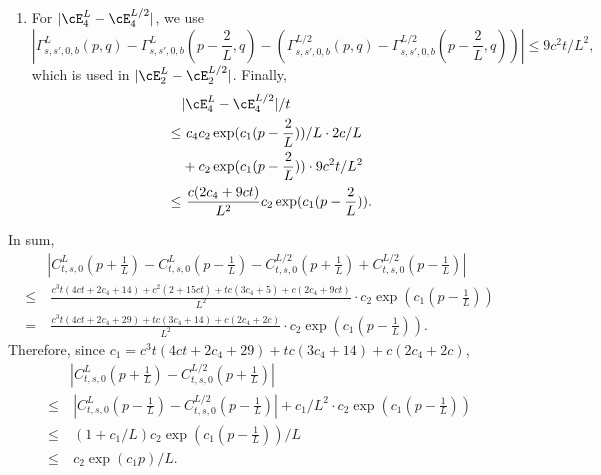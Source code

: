 \begin{enumerate}
    \[\tilde\cE_3^L=\frac2L\sum_{s'=0}^s C_{t,s',0}^{L}(p)\Gamma_{s,s',0,0}^{L}(p,p).\]
    Then we can bound
    \begin{align*}
        & |\cE_3^L-\cE_3^{L/2}|\\
        \leq &~ |\cE_3^L-\tilde\cE_3^{L}|+|\tilde\cE_3^L-\cE_3^{L/2}|\\
        \leq &~ \frac tL (c_4c_2\exp(c_1(p-\frac2L))/L \cdot c + c_2\exp(c_1(p-\frac2L)) \cdot c/L)\\
        & + \frac{2t}L (c_5c_2\exp(c_1(p-\frac1L))/L c + c_2\exp(c_1(p-\frac1L)) \cdot c/L)\\
        \leq &~ \frac{tc(c_4+1+2c_5+2)}{L^2}c_2\exp(c_1(p-\frac1L)).
    \end{align*}
    \item For $|\cE_4^L-\cE_4^{L/2}|$, we use \[|\Gamma^L_{s,s',0,b}(p,q) - \Gamma^L_{s,s',0,b}(p-\frac2L,q) - (\Gamma^{L/2}_{s,s',0,b}(p,q) - \Gamma^{L/2}_{s,s',0,b}(p-\frac2L,q))|        \leq 9c^2t/L^2,\] which is used in $|\cE_2^L-\cE_2^{L/2}|$. Finally,
    \begin{align*}
        & |\cE_4^L-\cE_4^{L/2}| / t\\
        \leq &~ c_4c_2\exp(c_1(p-\frac2L))/L\cdot 2c/L\\
        & + c_2\exp(c_1(p-\frac2L)) \cdot 9c^2t/L^2\\
        \leq &~ \frac{c(2c_4+9ct)}{L^2} c_2 \exp(c_1(p-\frac2L)).
    \end{align*}
\end{enumerate}

In sum, 
\begin{align*}
    & |C^L_{t,s,0}(p+\frac1L) - C^L_{t,s,0}(p-\frac1L) -C^{L/2}_{t,s,0}(p+\frac1L) + C^{L/2}_{t,s,0}(p-\frac1L)| \\
    \leq &~ \frac{c^3t(4ct+2c_4+14) + c^2(2+15ct) + tc(3c_4+5)+c(2c_4+9ct)}{L^2}\cdot c_2 \exp(c_1(p-\frac1L))\\
    = &~ \frac{c^3t(4ct+2c_4+29) + tc(3c_4+14)+c(2c_4+2c)}{L^2}\cdot c_2 \exp(c_1(p-\frac1L)).
\end{align*}
Therefore, since $c_1= c^3t(4ct+2c_4+29) + tc(3c_4+14)+c(2c_4+2c)$,
\begin{align*}
    & |C^L_{t,s,0}(p+\frac1L) -C^{L/2}_{t,s,0}(p+\frac1L)| \\
    \leq &~ |C^L_{t,s,0}(p-\frac1L) - C^{L/2}_{t,s,0}(p-\frac1L)| + c_1 / L^2 \cdot c_2 \exp(c_1(p-\frac1L))\\
    \leq&~ (1+c_1/L)c_2 \exp(c_1(p-\frac1L)) /L\\
    \leq&~ c_2\exp(c_1p)/L.
\end{align*}


